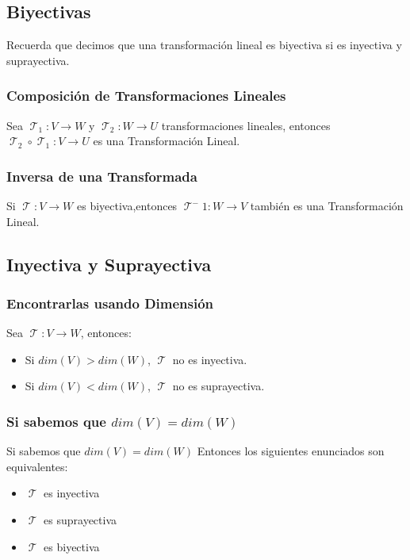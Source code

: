 \documentclass[12pt]{report}                                    %
\DeclareMathOperator \LinealTransformation {\mathcal{T}}        %
\DeclareMathOperator \LT {\mathcal{T}}                          %
\begin{document}
        \subsection{Biyectivas}
        
            Recuerda que decimos que una transformación lineal es biyectiva si es inyectiva y suprayectiva.

            \subsubsection{Composición de Transformaciones Lineales}
            Sea $\LT_1 : V \to W $ y $\LT_2 : W \to U $ transformaciones lineales, entonces
            $\LT_2 \circ \LT_1: V \to U$ es una Transformación Lineal.


            \subsubsection{Inversa de una Transformada}
            Si $\LinealTransformation : V \to W$ es biyectiva,entonces
            $\LinealTransformation^-1: W \to V$ también es una Transformación Lineal.


        \subsection{Inyectiva y Suprayectiva}

            \subsubsection{Encontrarlas usando Dimensión}

                Sea $\LinealTransformation: V \to W$, entonces:

                \begin{itemize}
                    \item Si $dim(V) > dim(W)$, $\LT$ no es inyectiva.
                    \item Si $dim(V) < dim(W)$, $\LT$ no es suprayectiva.
                \end{itemize}

            \subsubsection{Si sabemos que $dim(V) = dim(W)$}

                Si sabemos que $dim(V) = dim(W)$
                Entonces los siguientes enunciados son equivalentes:
                \begin{itemize}
                    \item $\LinealTransformation$ es inyectiva
                    \item $\LinealTransformation$ es suprayectiva
                    \item $\LinealTransformation$ es biyectiva
                \end{itemize}
\end{document}
